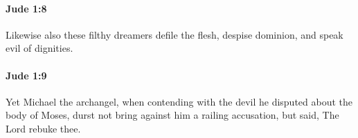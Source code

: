 		\paragraph{Jude 1:8} %
			\label{JUDE-1-8}

			Likewise also these filthy dreamers defile the flesh, despise dominion, and speak evil of dignities.

			\begin{framed}
			\scriptsize
				\begin{compactdesc}
					\item[SBLG] 
				\end{compactdesc}
			\end{framed}

		\paragraph{Jude 1:9} %
			\label{JUDE-1-9}

			Yet Michael the archangel, when contending with the devil he disputed about the body of Moses, durst not bring against him a railing accusation, but said, The Lord rebuke thee.

